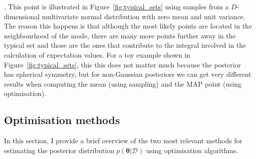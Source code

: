 \documentclass[12pt,dvipsnames]{report}
\renewcommand{\vec}[1]{\boldsymbol{\mathbf{#1}}}
\begin{document}
\citep[for a good overview of this issue see][]{arXiv:1701.02434}.
This point is illustrated in Figure~\ref{fig:typical_sets} using samples from 
a $D$-dimensional multivariate normal distribution with zero mean and unit 
variance. 
The reason this happens is that  although the most likely points are located 
in the neighbourhood of the mode, 
there are many more points further away in the typical set and those are the 
ones that contribute to the integral involved in the calculation of expectation 
values.
For a toy example shown in Figure~\ref{fig:typical_sets}, this this does not 
matter much because the posterior has spherical symmetry, but for non-Gaussian
posteriors we can get very different results  when computing the mean (using
sampling) and the MAP point (using optimisation).


\subsection{Optimisation methods}
In this section, I provide a brief overview of the two most relevant methods for
estimating the posterior distribution $p(\vec{\theta}\lvert \mathcal{D})$ using
optimisation algorithms.
\end{document}
